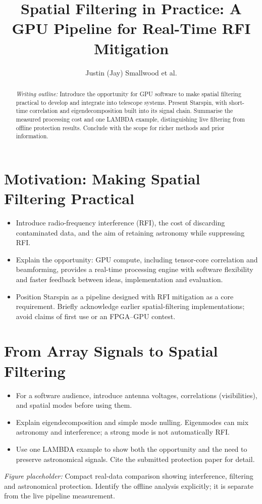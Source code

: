 \documentclass[11pt,twoside]{article}
\begin{document}
\title{Spatial Filtering in Practice: A GPU Pipeline for Real-Time RFI Mitigation}
\author{Justin (Jay) Smallwood et al.}

\begin{abstract}
\textit{Writing outline:} Introduce the opportunity for GPU software to make
spatial filtering practical to develop and integrate into telescope systems.
Present Starspin, with short-time correlation and eigendecomposition built
into its signal chain. Summarise the measured processing cost and one
LAMBDA example, distinguishing live filtering from offline protection results.
Conclude with the scope for richer methods and prior information.
\end{abstract}

\section{Motivation: Making Spatial Filtering Practical}
\begin{itemize}
\item Introduce radio-frequency interference (RFI), the cost of discarding
contaminated data, and the aim of retaining astronomy while suppressing RFI.
\item Explain the opportunity: GPU compute, including tensor-core correlation
and beamforming, provides a real-time processing engine with software
flexibility and faster feedback between ideas, implementation and evaluation.
\item Position Starspin as a pipeline designed with RFI mitigation as a core
requirement. Briefly acknowledge earlier spatial-filtering implementations;
avoid claims of first use or an FPGA--GPU contest.
\end{itemize}

\section{From Array Signals to Spatial Filtering}
\begin{itemize}
\item For a software audience, introduce antenna voltages, correlations
(visibilities), and spatial modes before using them.
\item Explain eigendecomposition and simple mode nulling. Eigenmodes can mix
astronomy and interference; a strong mode is not automatically RFI.
\item Use one LAMBDA example to show both the opportunity and the need to
preserve astronomical signals. Cite the submitted protection paper for detail.
\end{itemize}
\noindent\textit{Figure placeholder:} Compact real-data comparison showing
interference, filtering and astronomical protection. Identify the offline
analysis explicitly; it is separate from the live pipeline measurement.
\end{document}
